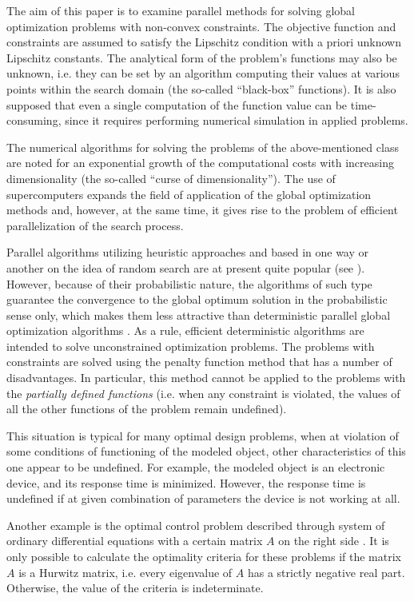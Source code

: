 \documentclass{llncs}
\begin{document}
The aim of this paper is to examine parallel methods for solving global optimization problems 
with non-convex constraints. The objective function and constraints are assumed to satisfy the 
Lipschitz condition with a priori unknown Lipschitz constants. The analytical form of the 
problem's functions may also be unknown, i.e. they can be set by an algorithm computing their 
values at various points within the search domain (the so-called ``black-box'' functions). It is 
also supposed that even a single computation of the function value can be time-consuming, 
since it requires performing numerical simulation in applied problems. 

The numerical algorithms for solving the problems of the above-mentioned class are noted for 
an exponential growth of the computational costs with increasing dimensionality (the so-called 
``curse of dimensionality''). The use of supercomputers expands the field of application of the 
global optimization methods and, however, at the same time, it gives rise to the problem of 
efficient parallelization of the search process.

Parallel algorithms utilizing heuristic approaches and based in one way or another on the idea of 
random search are at present quite popular (see \cite{RefFerreiro,RefZhu,Korosec,Guerrero}). 
However, because of their probabilistic nature, the algorithms of such type guarantee the 
convergence to the global optimum solution in the probabilistic sense only, which makes them 
less attractive than deterministic parallel global optimization algorithms 
\cite{Jones2001,Paulavicius2011,Evtushenko2013,Strongin2000}. As a rule, efficient 
deterministic algorithms are intended to solve unconstrained optimization problems. The 
problems with constraints are solved using the penalty function method that has a number of 
disadvantages. In particular, this method cannot be applied to the problems with the 
\textit{partially defined functions} (i.e. when any constraint is violated, the values of all the 
other functions of the problem remain undefined).

This situation is typical for many optimal design problems, when at violation of some conditions 
of functioning of the modeled object, other characteristics of this one appear to be undefined. 
For example, the modeled object is an electronic device, and its response time is minimized. 
However, the response time is undefined if at given combination of parameters the device is not 
working at all.

Another example is the optimal control problem described through system of ordinary 
differential equations with a certain matrix $A$ on the right side \cite{Balandin2017}. It is only 
possible to calculate the optimality criteria for these problems if the matrix $A$ is a Hurwitz 
matrix, i.e. every eigenvalue of $A$ has a strictly negative real part. Otherwise, the value of the 
criteria is indeterminate.
\end{document}
